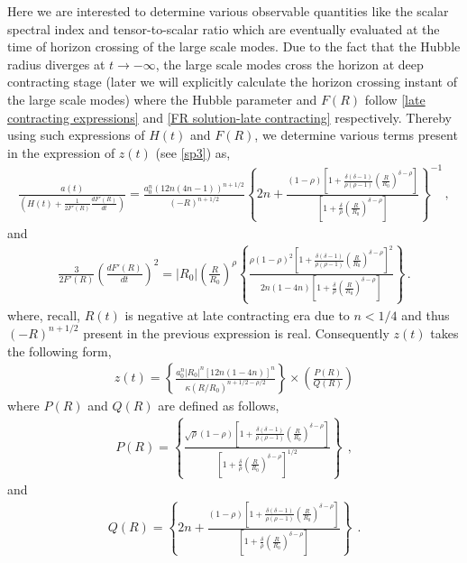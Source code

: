 \documentclass{article}
\begin{document}
Here we are interested to determine various observable quantities like the scalar spectral index and tensor-to-scalar ratio which are eventually 
evaluated at the time of horizon crossing of the large scale modes. Due to the fact that the Hubble radius diverges at $t \rightarrow -\infty$, the large 
scale modes cross the horizon at deep contracting stage (later we will explicitly calculate the horizon crossing instant of the large scale modes) 
where the Hubble parameter and $F(R)$ follow \ref{late contracting expressions} and 
\ref{FR solution-late contracting} respectively. Thereby using such expressions of $H(t)$ and $F(R)$, we determine various terms present in
the expression of $z(t)$ (see \ref{sp3}) as,
\begin{align}
\frac{a(t)}{\left(H(t) + \frac{1}{2F'(R)}\frac{dF'(R)}{dt}\right)}
= \frac{a_0^n\left(12n(4n-1)\right)^{n+1/2}}{\left(-R\right)^{n+1/2}}
\left\{2n + \frac{(1-\rho)\left[1 + \frac{\delta(\delta-1)}{\rho(\rho-1)}
\left(\frac{R}{R_0}\right)^{\delta-\rho}\right]}
{\left[1 + \frac{\delta}{\rho}\left(\frac{R}{R_0}\right)^{\delta-\rho}\right]}\right\}^{-1}\, ,
\nonumber
\end{align}
and
\begin{align}
\frac{3}{2F'(R)}\left(\frac{dF'(R)}{dt}\right)^2
= |R_0|\left(\frac{R}{R_0}\right)^{\rho} \left\{\frac{\rho(1-\rho)^2
\left[1 + \frac{\delta(\delta-1)}{\rho(\rho-1)}
\left(\frac{R}{R_0}\right)^{\delta-\rho}\right]^2} {2n(1-4n)\left[1
+ \frac{\delta}{\rho}\left(\frac{R}{R_0}\right)^{\delta-\rho}\right]}\right\}\, .
\nonumber
\end{align}
where, recall, $R(t)$ is negative at late contracting era due to $n < 1/4$ and thus $\left(-R\right)^{n+1/2}$ present in the previous expression 
is real. Consequently $z(t)$ takes the following form,
\begin{eqnarray}
z(t) = \left\{\frac{a_0^n|R_0|^n\left[12n(1-4n)\right]^n}{\kappa\left(R/R_0\right)^{n+1/2-\rho/2}}\right\}\times\left(\frac{P(R)}{Q(R)}\right)
\label{sp4}
\end{eqnarray}
where $P(R)$ and $Q(R)$ are defined as follows,
\begin{align}
P(R) = \left\{\frac{\sqrt{\rho}(1-\rho)
\left[1 + \frac{\delta(\delta-1)}{\rho(\rho-1)}
\left(\frac{R}{R_0}\right)^{\delta-\rho}\right]}{\left[1
+ \frac{\delta}{\rho}\left(\frac{R}{R_0}\right)^{\delta-\rho}\right]^{1/2}}\right\}~~,
\label{P}
\end{align}
and
\begin{align}
Q(R) = \left\{2n + \frac{(1-\rho)\left[1 + \frac{\delta(\delta-1)}{\rho(\rho-1)}
\left(\frac{R}{R_0}\right)^{\delta-\rho}\right]}
{\left[1 + \frac{\delta}{\rho}\left(\frac{R}{R_0}\right)^{\delta-\rho}\right]}\right\}~~.
\label{Q}
\end{align}
\end{document}
